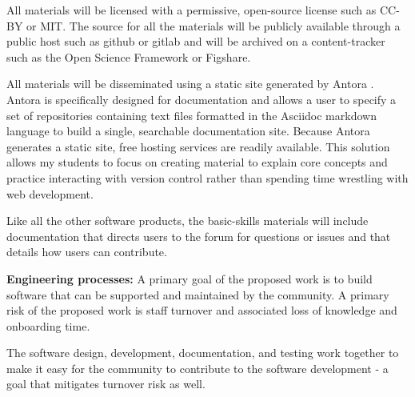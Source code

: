All materials will be licensed with  a permissive, open-source license such as CC-BY or MIT.  The source for all the materials will be publicly available through a public host such as github or gitlab and will be archived on a content-tracker such as the Open Science Framework or Figshare.

All materials will be disseminated using a static site generated by Antora \cite{antora}.  Antora is specifically designed for documentation and allows a user to specify a set of repositories containing text files formatted in the Asciidoc markdown language to build a single, searchable documentation site.  Because Antora generates a static site, free hosting services are readily available.  This solution allows my students to focus on creating material to explain core concepts and practice interacting with version control rather than spending time wrestling with web development.


Like all the other software products, the basic-skills materials  will include documentation that directs users to the forum for questions or issues and  that details how users can contribute. 


\textbf{Engineering processes:}
A primary goal of the proposed work is to build software that can be supported and maintained by the community.  A primary risk of the proposed work is staff turnover and associated loss of knowledge and onboarding time.

The software design, development, documentation, and testing work together to make it easy for the community to contribute to the software development - a goal that mitigates turnover risk as well.

